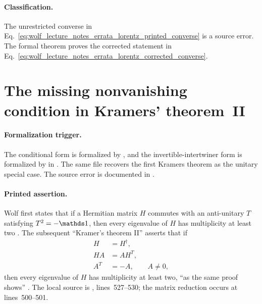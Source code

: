 \documentclass{article}
\begin{document}
\paragraph{Classification.}
The unrestricted converse in
Eq.~\ref{eq:wolf_lecture_notes_errata_lorentz_printed_converse} is a source
error. The formal theorem proves the corrected statement in
Eq.~\ref{eq:wolf_lecture_notes_errata_lorentz_corrected_converse}.

\section{The missing nonvanishing condition in Kramers' theorem~II}
\label{sec:kramers-ii}

\paragraph{Formalization trigger.}
The conditional form is formalized by
,
and the invertible-intertwiner form is formalized by
in . The same file recovers the
first Kramers theorem as the unitary special case. The source error is
documented in
.

\paragraph{Printed assertion.}
Wolf first states that if a Hermitian matrix $H$ commutes with an anti-unitary
$T$ satisfying $T^2=-\Id$, then every eigenvalue of $H$ has multiplicity at
least two \cite{Wolf2012Quantum}. The subsequent ``Kramer's theorem II''
asserts that if
\begin{align}
    H&=H^\dagger,
    \label{eq:wolf_lecture_notes_errata_kramers_hermitian}\\
    HA&=AH^T,
    \label{eq:wolf_lecture_notes_errata_kramers_intertwining}\\
    A^T&=-A,\qquad A\neq0,
    \label{eq:wolf_lecture_notes_errata_kramers_antisymmetric}
\end{align}
then every eigenvalue of $H$ has multiplicity at least two, ``as the same proof
shows'' \cite{Wolf2012Quantum}. The local source is
,
lines~527--530; the matrix reduction occurs at lines~500--501.
\end{document}
